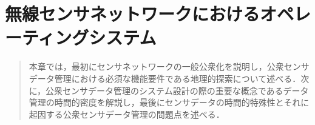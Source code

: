 \chapter{無線センサネットワークにおけるオペレーティングシステム}\label{chap:os_in_WSN}
\begin{large}
\begin{quote}
本章では，最初にセンサネットワークの一般公衆化を説明し，公衆センサデータ管理における必須な機能要件である地理的探索について述べる．次に，公衆センサデータ管理のシステム設計の際の重要な概念であるデータ管理の時間的密度を解説し，最後にセンサデータの時間的特殊性とそれに起因する公衆センサデータ管理の問題点を述べる．
\end{quote}
\end{large}
\clearpage




